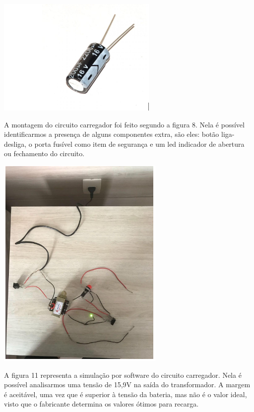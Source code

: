                                         
                            \begin{center}
    	\includegraphics[scale=0.7]{figuras/capacitor}
        \label{capacitor}
    \end{center}

  
A montagem do circuito carregador foi feito segundo a figura 8. Nela é possível identificarmos a presença de alguns componentes extra, são eles: botão liga-desliga, o porta fusível como item de segurança  e um led indicador de abertura ou fechamento do circuito. 

          
      \begin{center}
    	\includegraphics[scale=0.7]{figuras/circuito}
        \label{circuito}
    \end{center}
A figura 11 representa a simulação por software do circuito carregador. Nela é possível analisarmos uma tensão de 15,9V na saída do transformador. A margem é aceitável, uma vez que é superior à tensão da bateria, mas não é o valor ideal, visto que o fabricante determina os valores ótimos para recarga.
   

